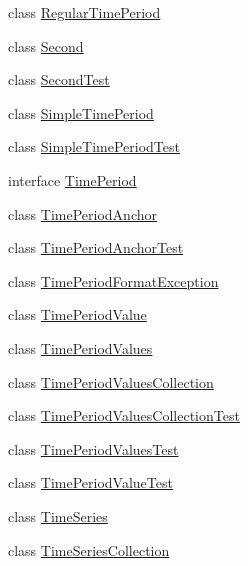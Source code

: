 \begin{DoxyCompactItemize}
\item 
class \mbox{\hyperlink{classorg_1_1jfree_1_1data_1_1time_1_1_regular_time_period}{Regular\+Time\+Period}}
\item 
class \mbox{\hyperlink{classorg_1_1jfree_1_1data_1_1time_1_1_second}{Second}}
\item 
class \mbox{\hyperlink{classorg_1_1jfree_1_1data_1_1time_1_1_second_test}{Second\+Test}}
\item 
class \mbox{\hyperlink{classorg_1_1jfree_1_1data_1_1time_1_1_simple_time_period}{Simple\+Time\+Period}}
\item 
class \mbox{\hyperlink{classorg_1_1jfree_1_1data_1_1time_1_1_simple_time_period_test}{Simple\+Time\+Period\+Test}}
\item 
interface \mbox{\hyperlink{interfaceorg_1_1jfree_1_1data_1_1time_1_1_time_period}{Time\+Period}}
\item 
class \mbox{\hyperlink{classorg_1_1jfree_1_1data_1_1time_1_1_time_period_anchor}{Time\+Period\+Anchor}}
\item 
class \mbox{\hyperlink{classorg_1_1jfree_1_1data_1_1time_1_1_time_period_anchor_test}{Time\+Period\+Anchor\+Test}}
\item 
class \mbox{\hyperlink{classorg_1_1jfree_1_1data_1_1time_1_1_time_period_format_exception}{Time\+Period\+Format\+Exception}}
\item 
class \mbox{\hyperlink{classorg_1_1jfree_1_1data_1_1time_1_1_time_period_value}{Time\+Period\+Value}}
\item 
class \mbox{\hyperlink{classorg_1_1jfree_1_1data_1_1time_1_1_time_period_values}{Time\+Period\+Values}}
\item 
class \mbox{\hyperlink{classorg_1_1jfree_1_1data_1_1time_1_1_time_period_values_collection}{Time\+Period\+Values\+Collection}}
\item 
class \mbox{\hyperlink{classorg_1_1jfree_1_1data_1_1time_1_1_time_period_values_collection_test}{Time\+Period\+Values\+Collection\+Test}}
\item 
class \mbox{\hyperlink{classorg_1_1jfree_1_1data_1_1time_1_1_time_period_values_test}{Time\+Period\+Values\+Test}}
\item 
class \mbox{\hyperlink{classorg_1_1jfree_1_1data_1_1time_1_1_time_period_value_test}{Time\+Period\+Value\+Test}}
\item 
class \mbox{\hyperlink{classorg_1_1jfree_1_1data_1_1time_1_1_time_series}{Time\+Series}}
\item 
class \mbox{\hyperlink{classorg_1_1jfree_1_1data_1_1time_1_1_time_series_collection}{Time\+Series\+Collection}}

\end{DoxyCompactItemize}
